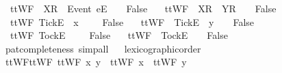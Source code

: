 \ \ {\isachardoublequoteopen}ttWF{}\ {\isasymrho}\ {\isacharparenleft}{\isacharbrackleft}X{\isacharbrackright}\isactrlsub R\ {\isacharhash}\ {\isacharbrackleft}Event\ e{\isacharbrackright}\isactrlsub E\ {\isacharhash}\ {\isasymsigma}{\isacharparenright}\ {\isacharequal}\ False{\isachardoublequoteclose}\ {\isacharbar}\isanewline
\ \ {\isachardoublequoteopen}ttWF{}\ {\isasymrho}\ {\isacharparenleft}{\isacharbrackleft}X{\isacharbrackright}\isactrlsub R\ {\isacharhash}\ {\isacharbrackleft}Y{\isacharbrackright}\isactrlsub R\ {\isacharhash}\ {\isasymsigma}{\isacharparenright}\ {\isacharequal}\ False{\isachardoublequoteclose}\ {\isacharbar}\isanewline
\ \ {\isachardoublequoteopen}ttWF{}\ {\isacharparenleft}{\isacharbrackleft}Tick{\isacharbrackright}\isactrlsub E\ {\isacharhash}\ x\ {\isacharhash}\ {\isasymrho}{\isacharparenright}\ {\isasymsigma}\ {\isacharequal}\ False{\isachardoublequoteclose}\ {\isacharbar}\isanewline
\ \ {\isachardoublequoteopen}ttWF{}\ {\isasymrho}\ {\isacharparenleft}{\isacharbrackleft}Tick{\isacharbrackright}\isactrlsub E\ {\isacharhash}\ y\ {\isacharhash}\ {\isasymsigma}{\isacharparenright}\ {\isacharequal}\ False{\isachardoublequoteclose}\ {\isacharbar}\isanewline
\ \ {\isachardoublequoteopen}ttWF{}\ {\isacharparenleft}{\isacharbrackleft}Tock{\isacharbrackright}\isactrlsub E\ {\isacharhash}\ {\isasymrho}{\isacharparenright}\ {\isasymsigma}\ {\isacharequal}\ False{\isachardoublequoteclose}\ {\isacharbar}\isanewline
\ \ {\isachardoublequoteopen}ttWF{}\ {\isasymrho}\ {\isacharparenleft}{\isacharbrackleft}Tock{\isacharbrackright}\isactrlsub E\ {\isacharhash}\ {\isasymsigma}{\isacharparenright}\ {\isacharequal}\ False{\isachardoublequoteclose}\isanewline
%
\isadelimproof
\ \ %
\endisadelimproof
%
\isatagproof
{}\isamarkupfalse%
\ {\isacharparenleft}pat{\isacharunderscore}completeness{\isacharcomma}\ simp{\isacharunderscore}all{\isacharparenright}%
\endisatagproof
{\isafoldproof}%
%
\isadelimproof
\isanewline
%
\endisadelimproof
{}\isamarkupfalse%
%
\isadelimproof
\ %
\endisadelimproof
%
\isatagproof
{}\isamarkupfalse%
\ lexicographic{\isacharunderscore}order%
\endisatagproof
{\isafoldproof}%
%
\isadelimproof
%
\endisadelimproof
\isanewline
\isanewline
{}\isamarkupfalse%
\isanewline
\isanewline
{}\isamarkupfalse%
\ ttWF{}{\isacharunderscore}ttWF{\isacharcolon}\ {\isachardoublequoteopen}ttWF{}\ x\ y\ {\isacharequal}\ {\isacharparenleft}ttWF\ x\ {\isasymand}\ ttWF\ y{\isacharparenright}{\isachardoublequoteclose}\isanewline
